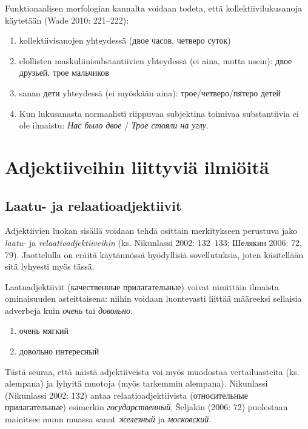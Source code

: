 \documentclass[]{scrreprt}
\providecommand{\tightlist}{%
  \setlength{\itemsep}{0pt}\setlength{\parskip}{0pt}}
\begin{document}
Funktionaalisen morfologian kannalta voidaan todeta, että
kollektiivilukusanoja käytetään (Wade 2010: 221--222):

\begin{enumerate}
\def\labelenumi{\arabic{enumi})}
\tightlist
\item
  kollektiivisanojen yhteydessä (двое часов, четверо суток)
\item
  elollisten maskuliinisubstantiivien yhteydessä (ei aina, mutta usein):
  двое друзьей, трое мальчиков
\item
  sanan дети yhteydessä (ei myöskään aina): трое/четверо/пятеро детей
\item
  Kun lukusanasta normaalisti riippuvaa subjektina toimivaa
  substantiivia ei ole ilmaistu: \emph{Нас было двое} / \emph{Трое
  стояли на углу}.
\end{enumerate}

\section{Adjektiiveihin liittyviä
ilmiöitä}\label{adjektiiveihin-liittyviuxe4-ilmiuxf6ituxe4}

\subsection{Laatu- ja
relaatioadjektiivit}\label{laatu--ja-relaatioadjektiivit}

Adjektiivien luokan sisällä voidaan tehdä osittain merkitykseen
perustuva jako \emph{laatu-} ja \emph{relaatioadjektiiveihin} (ks.
Nikunlassi 2002: 132--133; Шелякин 2006: 72, 79). Jaottelulla on eräitä
käytännössä hyödyllisiä sovellutuksia, joten käsitellään sitä lyhyesti
myös tässä.

Laatuadjektiivit (качественные прилагательные) voivat nimittäin ilmaista
ominaisuuden asteittaisena: niihin voidaan luontevasti liittää määreeksi
sellaisia adverbeja kuin \emph{очень} tai \emph{довольно}.

\begin{enumerate}
\def\labelenumi{(\arabic{enumi})}
\setcounter{enumi}{11}
\tightlist
\item
  очень мягкий
\item
  довольно интересный
\end{enumerate}

Tästä seuraa, että näistä adjektiiveista voi myös muodostaa
vertailuasteita (ks. alempana) ja lyhyitä muotoja (myös tarkemmin
alempana). Nikunlassi (Nikunlassi 2002: 132) antaa relaatioadjektiivista
(относительные прилагательные) esimerkin \emph{государственный},
Šeljakin (2006: 72) puolestaan mainitsee muun muassa sanat
\emph{железный} ja \emph{московский}.
\end{document}
